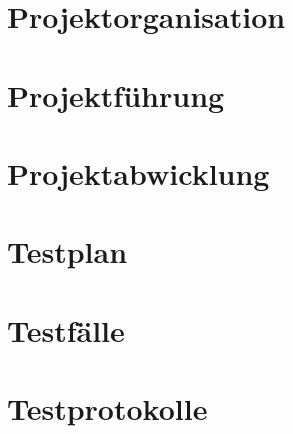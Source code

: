 \documentclass[a4paper]{scrreprt}
\begin{document}
\section{Projektorganisation}

\section{Projektführung}

\section{Projektabwicklung}

\section{Testplan}

\section{Testfälle}

\section{Testprotokolle}


\appendix
\end{document}
